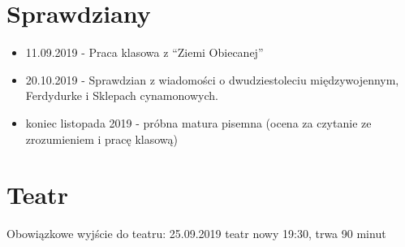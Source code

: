 \documentclass[a4paper]{article}
\begin{document}
\section{Sprawdziany}
\begin{itemize}
    \item 11.09.2019 - Praca klasowa z ``Ziemi Obiecanej''
    \item 20.10.2019 - Sprawdzian z wiadomości o dwudziestoleciu międzywojennym, Ferdydurke i Sklepach cynamonowych.
    \item koniec listopada 2019 - próbna matura pisemna (ocena za czytanie ze zrozumieniem i pracę klasową)
\end{itemize}
\section{Teatr}
Obowiązkowe wyjście do teatru: 25.09.2019 teatr nowy 19:30, trwa 90 minut
\end{document}
